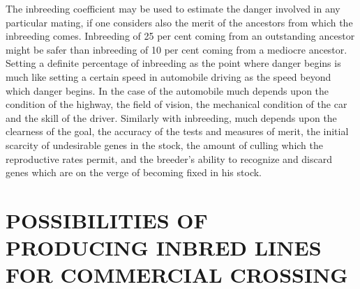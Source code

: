 The inbreeding coefficient may be used to estimate the danger
involved in any particular mating, if one considers also the merit of the
ancestors from which the inbreeding comes. Inbreeding of 25 per cent
coming from an outstanding ancestor might be safer than inbreeding of
10 per cent coming from a mediocre ancestor. Setting a definite percentage
of inbreeding as the point where danger begins is much like
setting a certain speed in automobile driving as the speed beyond which
danger begins. In the case of the automobile much depends upon the
condition of the highway, the field of vision, the mechanical condition
of the car and the skill of the driver. Similarly with inbreeding, much
depends upon the clearness of the goal, the accuracy of the tests and
measures of merit, the initial scarcity of undesirable genes in the stock,
the amount of culling which the reproductive rates permit, and the
breeder's ability to recognize and discard genes which are on the verge
of becoming fixed in his stock.

\section*{POSSIBILITIES OF PRODUCING INBRED LINES FOR COMMERCIAL CROSSING}

